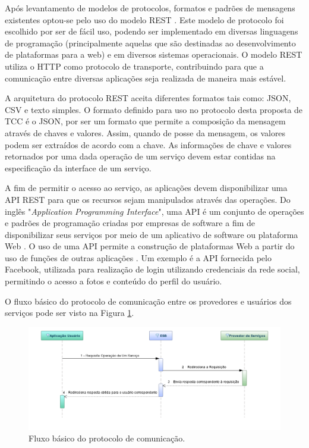 Após levantamento de modelos de protocolos, formatos e padrões de mensagens existentes optou-se pelo uso do modelo REST \cite{rozlog_restesoap_2013}. Este modelo de protocolo foi escolhido por ser de fácil uso, podendo ser implementado em diversas linguagens de programação (principalmente aquelas que são destinadas ao desenvolvimento de plataformas para a web) e em diversos sistemas operacionais. O modelo REST utiliza o HTTP como protocolo de transporte, contribuindo para que a comunicação entre diversas aplicações seja realizada de maneira mais estável.

A arquitetura do protocolo REST aceita diferentes formatos tais como: JSON, CSV e texto simples. O formato definido para uso no protocolo desta proposta de TCC é o JSON, por ser um formato que permite a composição da mensagem através de chaves e valores. Assim, quando de posse da mensagem, os valores podem ser extraídos de acordo com a chave. As informações de chave e valores retornados por uma dada operação de um serviço devem estar contidas na especificação da interface de um serviço.


A fim de permitir o acesso ao serviço, as aplicações devem disponibilizar uma API REST para que os recursos sejam manipulados através das operações. Do inglês "\textit{Application Programming Interface}", uma API é um conjunto de operações e padrões de programação criadas por empresas de software a fim de disponibilizar seus serviços por meio de um aplicativo de software ou plataforma Web \cite{canaltech_o_2015}. O uso de uma API permite a construção de plataformas Web a partir do uso de funções de outras aplicações \cite{canaltech_o_2015}. Um exemplo é a API fornecida pelo Facebook, utilizada para realização de login utilizando credenciais da rede social, permitindo o acesso a fotos e conteúdo do perfil do usuário.

O fluxo básico do protocolo de comunicação entre os provedores e usuários dos serviços pode ser visto na Figura \ref{fluxo_basico_protocolo}.

\begin{figure}[htb]
\centering
\includegraphics[width=1\textwidth]{figuras/fluxo_basico_protocolo.png}
\caption{Fluxo básico do protocolo de comunicação.}
\label{fluxo_basico_protocolo}
\end{figure}

